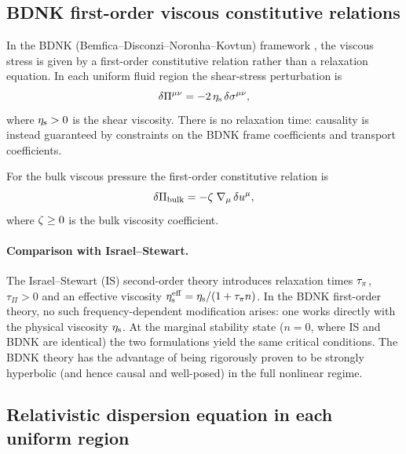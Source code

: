 \subsection{BDNK first-order viscous constitutive relations}
\label{sec:rel-10-94-BDNK}

In the BDNK (Bemfica--Disconzi--Noronha--Kovtun) framework
\citep{BemficaDN2018,Kovtun2019}, the viscous stress is given by a
first-order constitutive relation rather than a relaxation equation.
In each uniform fluid region the shear-stress perturbation is
\begin{equation}\label{eq:rel-10-BDNK-shear}
  \delta\Pi^{\mu\nu}
  = -2\,\eta_{\mathrm{s}}\,\delta\sigma^{\mu\nu},
\end{equation}
where $\eta_{\mathrm{s}} > 0$ is the shear viscosity.  There is no
relaxation time: causality is instead guaranteed by constraints on
the BDNK frame coefficients and transport coefficients.

For the bulk viscous pressure the first-order constitutive relation is
\begin{equation}\label{eq:rel-10-BDNK-bulk}
  \delta\Pi_{\mathrm{bulk}}
  = -\zeta\;\nabla_{\mu}\,\delta u^{\mu},
\end{equation}
where $\zeta \geq 0$ is the bulk viscosity coefficient.

\paragraph{Comparison with Israel--Stewart.}
The Israel--Stewart (IS) second-order theory introduces relaxation
times $\tau_{\pi}$, $\tau_\Pi > 0$ and an effective viscosity
$\eta_{\mathrm{s}}^{\mathrm{eff}} = \eta_{\mathrm{s}}/(1+\tau_{\pi} n)$.
In the BDNK first-order theory, no such frequency-dependent
modification arises: one works directly with the physical viscosity
$\eta_{\mathrm{s}}$.  At the marginal stability state ($n=0$, where IS
and BDNK are identical) the two formulations yield the same
critical conditions.  The BDNK theory has the advantage of being
rigorously proven to be strongly hyperbolic (and hence causal and
well-posed) in the full nonlinear regime.

\subsection{Relativistic dispersion equation in each uniform region}
\label{sec:rel-10-94-disp}

